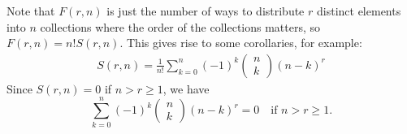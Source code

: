 \documentclass[math]{amznotes}
\theoremstyle{remark}
\begin{document}
Note that $F(r, n)$ is just the number of ways to distribute $r$ distinct elements into $n$ collections where the order of the collections matters, so $F(r, n) = n!S(r, n)$. This gives rise to some corollaries, for example:
\begin{align*}
    S(r, n) =\frac{1}{n!} \sum_{k = 0}^{n}(-1)^k \begin{pmatrix}
        n \\
        k
    \end{pmatrix}(n - k)^r
\end{align*}
Since $S(r, n) = 0$ if $n > r \geq 1$, we have
\begin{equation*}
    \sum_{k = 0}^{n}(-1)^k \begin{pmatrix}
        n \\
        k
    \end{pmatrix}(n - k)^r = 0 \quad \textrm{if }n > r \geq 1.
\end{equation*}
\end{document}
